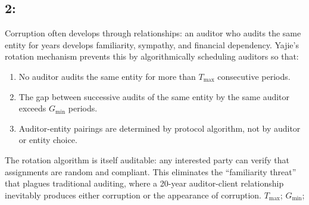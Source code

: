 \documentclass[12pt,a4paper]{article}
\theoremstyle{remark}
\begin{document}
\subsection{2:}
Corruption often develops through relationships: an auditor who audits the same entity 
for years develops familiarity, sympathy, and financial dependency. Yajie's rotation 
mechanism prevents this by algorithmically scheduling auditors so that:
\begin{enumerate}[label=(\alph*), leftmargin=*]
 \item No auditor audits the same entity for more than $T_{\max}$ consecutive periods.
 \item The gap between successive audits of the same entity by the same auditor exceeds 
 $G_{\min}$ periods.
 \item Auditor-entity pairings are determined by protocol algorithm, not by auditor or 
 entity choice.
\end{enumerate}
The rotation algorithm is itself auditable: any interested party can verify that 
assignments are random and compliant. This eliminates the ``familiarity threat'' that 
plagues traditional auditing, where a 20-year auditor-client relationship inevitably 
produces either corruption or the appearance of corruption.
\medskip
$T_{\max}$; $G_{\min}$; 
\end{document}
